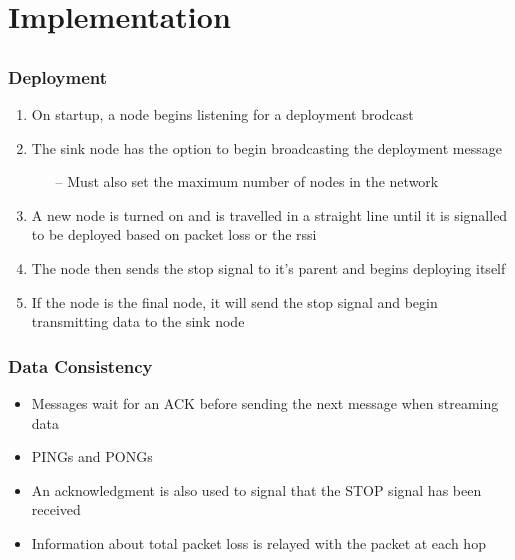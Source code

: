 \section{Implementation}
\subsection*{}

\begin{frame}[t]
  \frametitle{Deployment}

  \begin{enumerate}
  \item On startup, a node begins listening for a deployment brodcast
  \item The sink node has the option to begin broadcasting the deployment message
    \begin{itemize}
    \item[--] Must also set the maximum number of nodes in the network
    \end{itemize}
  \item A new node is turned on and is travelled in a straight line until it is signalled to be deployed based on packet loss or the rssi
  \item The node then sends the stop signal to it's parent and begins deploying itself
  \item If the node is the final node, it will send the stop signal and begin transmitting data to the sink node
    
  \end{enumerate}
  
\end{frame}

\begin{frame}
  \frametitle{Data Consistency}

  \begin{itemize}
  \item Messages wait for an ACK before sending the next message when streaming data
  \item PINGs and PONGs
  \item An acknowledgment is also used to signal that the STOP signal has been received
  \item Information about total packet loss is relayed with the packet at each hop
  \end{itemize}
  
\end{frame}

